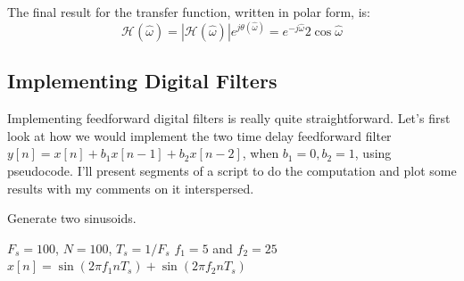 The final result for the transfer function, written in
polar form, is:
\begin{equation}
\mathcal{H}(\hat{\omega}) = |\mathcal{H}(\hat{\omega})|e^{j\theta(\hat{\omega})} = 
e^{-j\hat{\omega}}2\cos\hat{\omega} 
\label{eq:ff-2zth}
\end{equation}



\subsection{Implementing Digital Filters}

Implementing feedforward digital filters is really quite
straightforward. Let's first look at how we would implement the two
time delay feedforward filter $y[n]=x[n]+b_1x[n-1]+b_2x[n-2]$, when
$b_1=0, b_2=1$, using pseudocode.  I'll present segments of a script
to do the computation and plot some results with my comments on it
interspersed.

\begin{algorithm}
\caption{Generate two sinusoids.\label{alg:gensine}}
\begin{algorithmic}
\STATE $F_s=100$, $N=100$, $T_s=1/F_s$
\STATE $f_1=5$ and $f_2=25$
   \STATE $x[n] = \sin(2\pi f_1 n T_s)+\sin(2\pi f_2 n T_s)$
\ENDFOR
\end{algorithmic}
\end{algorithm}

%
%

